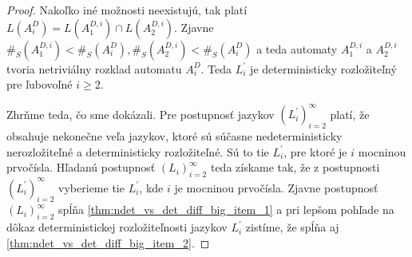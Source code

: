 \begin{proof}
Nakoľko iné možnosti neexistujú, tak platí $ L(A_i^D) = L(A_1^{D,i}) \cap L(A_2^{D,i}) $. Zjavne $ \#_S(A_1^{D,i}) < \#_S(A_i^D), \#_S(A_2^{D,i}) < \#_S(A_i^D) $ a teda automaty $ A_1^{D,i} $ a $ A_2^{D,i} $ tvoria netriviálny rozklad automatu $ A_i^D $. Teda $ L^{\prime}_i $ je deterministicky rozložiteľný pre ľubovoľné $ i \geq 2 $.
\par
Zhrňme teda, čo sme dokázali. Pre postupnosť jazykov $ (L^{\prime}_i)_{i=2}^{\infty} $ platí, že obsahuje nekonečne veľa jazykov, ktoré sú súčasne nedeterministicky nerozložiteľné a deterministicky rozložiteľné. Sú to tie $ L^{\prime}_i $, pre ktoré je $ i $ mocninou prvočísla. Hľadanú postupnosť $ (L_i)_{i=2}^{\infty} $ teda získame tak, že z postupnosti $ (L^{\prime}_i)_{i=2}^{\infty} $ vyberieme tie $ L^{\prime}_i $, kde $ i $ je mocninou prvočísla. Zjavne postupnosť $ (L_i)_{i=2}^{\infty} $ spĺňa \ref{thm:ndet_vs_det_diff_big_item_1} a pri lepšom pohľade na dôkaz deterministickej rozložiteľnosti jazykov $ L^{\prime}_i $ zistíme, že spĺňa aj \ref{thm:ndet_vs_det_diff_big_item_2}.

\end{proof}















